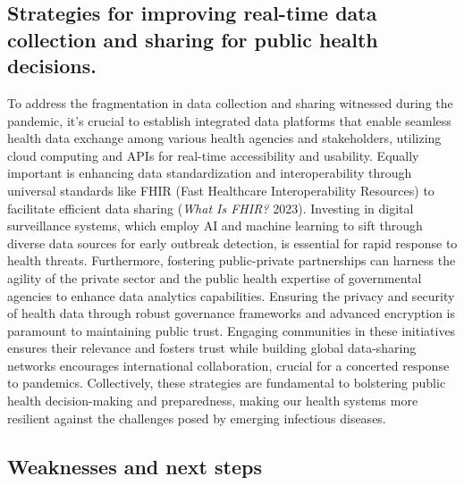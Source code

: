 \documentclass[
  letterpaper,
  DIV=11,
  numbers=noendperiod]{scrartcl}
\begin{document}
\hypertarget{strategies-for-improving-real-time-data-collection-and-sharing-for-public-health-decisions.}{%
\subsection{Strategies for improving real-time data collection and
sharing for public health
decisions.}\label{strategies-for-improving-real-time-data-collection-and-sharing-for-public-health-decisions.}}

To address the fragmentation in data collection and sharing witnessed
during the pandemic, it's crucial to establish integrated data platforms
that enable seamless health data exchange among various health agencies
and stakeholders, utilizing cloud computing and APIs for real-time
accessibility and usability. Equally important is enhancing data
standardization and interoperability through universal standards like
FHIR (Fast Healthcare Interoperability Resources) to facilitate
efficient data sharing (\emph{What Is FHIR?} 2023). Investing in digital
surveillance systems, which employ AI and machine learning to sift
through diverse data sources for early outbreak detection, is essential
for rapid response to health threats. Furthermore, fostering
public-private partnerships can harness the agility of the private
sector and the public health expertise of governmental agencies to
enhance data analytics capabilities. Ensuring the privacy and security
of health data through robust governance frameworks and advanced
encryption is paramount to maintaining public trust. Engaging
communities in these initiatives ensures their relevance and fosters
trust while building global data-sharing networks encourages
international collaboration, crucial for a concerted response to
pandemics. Collectively, these strategies are fundamental to bolstering
public health decision-making and preparedness, making our health
systems more resilient against the challenges posed by emerging
infectious diseases.

\hypertarget{weaknesses-and-next-steps}{%
\subsection{Weaknesses and next steps}\label{weaknesses-and-next-steps}}
\end{document}
